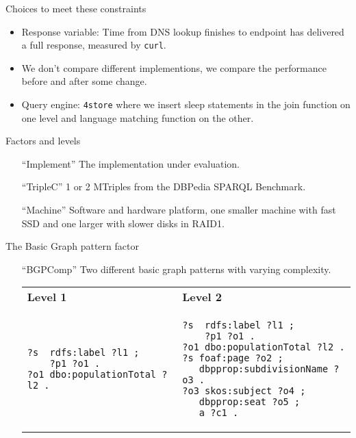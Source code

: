 \documentclass[english,handout,aspectratio=169]{ifislide}
\begin{document}
\begin{frame}{Choices to meet these constraints}

  \begin{itemize}
  \item Response variable: Time from DNS lookup finishes to endpoint
    has delivered a full response, measured by \texttt{curl}.
  \item We don't compare different implementions, we compare the
    performance before and after some change.
  \item Query engine: \texttt{4store} where we insert \textsf{sleep}
    statements in the join function on one level and language matching
    function on the other. 
  \end{itemize}

\end{frame}

\begin{frame}{Factors and levels}
  \begin{itemize}
  \item [``Implement''] The implementation under evaluation.
  \item [``TripleC''] 1 or 2 MTriples from the DBPedia SPARQL
    Benchmark.
  \item [``Machine''] Software and hardware platform, one smaller
    machine with fast SSD and one larger with slower disks in RAID1.
  \end{itemize}
\end{frame}

\begin{frame}[fragile]{The Basic Graph pattern factor}
  \begin{itemize}

  \item [``BGPComp''] Two different basic graph patterns with varying
    complexity.

  \begin{center}\small
    \begin{tabular}{|@{~~}p{}|@{~~}p{}|}
      \hline
      \textbf{Level 1} & \textbf{Level 2} \\[-2ex] 
      \begin{verbatim}
?s  rdfs:label ?l1 ;
    ?p1 ?o1 .
?o1 dbo:populationTotal ?l2 .
      \end{verbatim}
      & 
      \begin{verbatim}
?s  rdfs:label ?l1 ;
    ?p1 ?o1 .
?o1 dbo:populationTotal ?l2 .
?s foaf:page ?o2 ;
   dbpprop:subdivisionName ?o3 .
?o3 skos:subject ?o4 ;
   dbpprop:seat ?o5 ;
   a ?c1 .
\end{verbatim} 
\\      \hline
    \end{tabular}
  \end{center}


  \end{itemize}


\end{frame}
\end{document}
